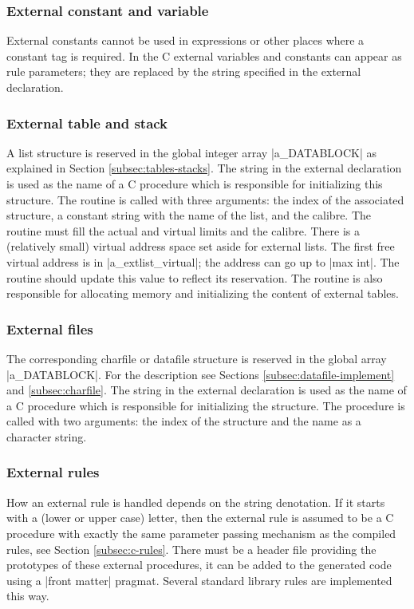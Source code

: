 \documentclass[titlepage]{article}
\newcommand\g[1]{\textsf{#1}}
\begin{document}
\subsubsection{External constant and variable}

External constants cannot be used in expressions or other places where a 
constant tag is required. In the {\sf C} external variables and constants 
can appear as rule parameters; they are replaced by the string specified in 
the \g{external declaration}.

\subsubsection{External table and stack}

A list structure is reserved in the global integer array \pp|a\_DATABLOCK|
as explained in Section \ref{subsec:tables-stacks}. The string in the
external declaration is used as the name of a {\sf C} procedure which is
responsible for initializing this structure. The routine is called with
three arguments: the index of the associated structure, a constant string
with the name of the list, and the calibre.
The routine must fill the actual and virtual limits and the calibre.
There is a (relatively small) virtual address space set aside for external
lists. The first free virtual address is in \pp|a\_extlist\_virtual|; the
address can go up to \pp|max int|. The routine should update this value to
reflect its reservation. The routine is also responsible for allocating memory
and initializing the content of external tables.

\subsubsection{External files}

The corresponding charfile or datafile structure is reserved in the global
array \pp|a\_DATABLOCK|. For the description see Sections
\ref{subsec:datafile-implement} and \ref{subsec:charfile}. The string in the
external declaration is used as the name of a {\sf C} procedure which is
responsible for
initializing the structure. The procedure is called with two arguments:
the index of the structure and the name as a character string.

\subsubsection{External rules}

How an external rule is handled depends on the \g{string denotation}. If it
starts with a (lower or upper case) letter, then the external rule is
assumed to be a {\sf C} procedure with exactly the same parameter passing
mechanism as the compiled rules, see Section \ref{subsec:c-rules}. There
must be a header file providing the prototypes of these external procedures,
it can be added to the generated code using a \pp|front matter| pragmat.
Several standard library rules are implemented this way.
\end{document}
